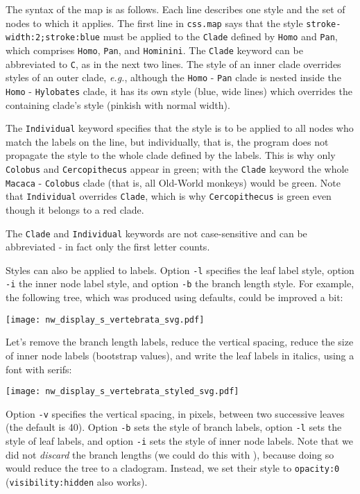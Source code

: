 The syntax of the \css{} map is as follows. Each line describes one style and the set of nodes to which it applies. The first line in \texttt{css.map} says that the style \texttt{stroke-width:2;stroke:blue} must be applied to the \texttt{Clade} defined by \texttt{Homo} and \texttt{Pan}, which comprises \texttt{Homo}, \texttt{Pan}, and \texttt{Hominini}. The \texttt{Clade} keyword can be abbreviated to \texttt{C}, as in the next two lines. The style of an inner clade overrides styles of an outer clade, \textit{e.g.}, although the \texttt{Homo} - \texttt{Pan} clade is nested inside the \texttt{Homo} - \texttt{Hylobates} clade, it has its own style (blue, wide lines) which overrides the containing clade's style (pinkish with normal width).

The \texttt{Individual} keyword specifies that the style is to be applied to all nodes who match the labels on the line, but individually, that is, the program does not propagate the style to the whole clade defined by the labels. This is why only \texttt{Colobus} and \texttt{Cercopithecus} appear in green; with the \texttt{Clade} keyword the whole \texttt{Macaca} - \texttt{Colobus} clade (that is, all Old-World monkeys) would be green. Note that \texttt{Individual} overrides \texttt{Clade}, which is why \texttt{Cercopithecus} is green even though it belongs to a red clade.

The \texttt{Clade} and \texttt{Individual} keywords are not case-sensitive and can be abbreviated - in fact only the first letter counts.

Styles can also be applied to labels. Option \texttt{-l} specifies the leaf
label style, option \texttt{-i} the inner node label style, and option
\texttt{-b} the branch length style. For example, the following tree, which was
produced using defaults, could be improved a bit:


\begin{center}
  \texttt{[image: nw\_display\_s\_vertebrata\_svg.pdf]}
\end{center}

\noindent{}Let's remove the branch length labels, reduce
the vertical spacing, reduce the size of inner node labels (bootstrap values),
and write the leaf labels in italics, using a font with serifs:

\begin{center}
  \texttt{[image: nw\_display\_s\_vertebrata\_styled\_svg.pdf]}
\end{center}
Option \texttt{-v} specifies the vertical spacing, in pixels, between two
successive leaves (the default is 40). Option \texttt{-b} sets the style of
branch labels, option \texttt{-l} sets the style of leaf labels, and option
\texttt{-i} sets the style of inner node labels. Note that we did not
\emph{discard} the branch lengths (we could do this with \topology), because
doing so would reduce the tree to a cladogram. Instead, we set their \css{}
style to \texttt{opacity:0} (\texttt{visibility:hidden} also works).

